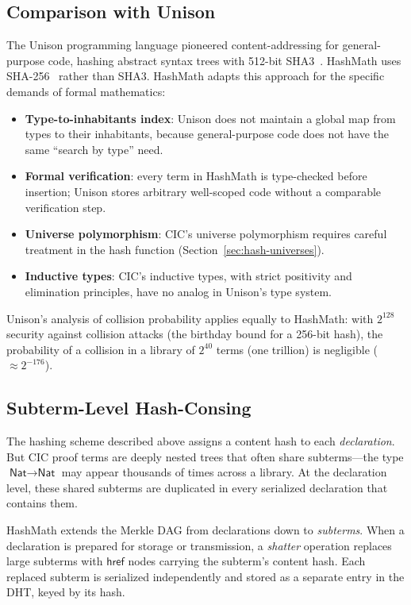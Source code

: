 \documentclass[11pt]{article}
\theoremstyle{definition}
\theoremstyle{plain}
\theoremstyle{remark}
\newcommand{\Nat}{\textsf{Nat}}
\newcommand{\hrefE}{\textsf{href}}
\begin{document}
\subsection{Comparison with Unison}
\label{sec:unison}

The Unison programming language pioneered content-addressing for general-purpose code,
hashing abstract syntax trees with 512-bit SHA3~\cite{unison}.
HashMath uses SHA-256~\cite{sha256} rather than SHA3.
HashMath adapts this approach for the specific demands of formal mathematics:

\begin{itemize}[nosep]
  \item \textbf{Type-to-inhabitants index}: Unison does not maintain a global map from types
    to their inhabitants, because general-purpose code does not have the same ``search by type'' need.
  \item \textbf{Formal verification}: every term in HashMath is type-checked before insertion;
    Unison stores arbitrary well-scoped code without a comparable verification step.
  \item \textbf{Universe polymorphism}: CIC's universe polymorphism requires careful treatment
    in the hash function (Section~\ref{sec:hash-universes}).
  \item \textbf{Inductive types}: CIC's inductive types, with strict positivity and elimination principles,
    have no analog in Unison's type system.
\end{itemize}

Unison's analysis of collision probability applies equally to HashMath: with $2^{128}$
security against collision attacks (the birthday bound for a 256-bit hash), the probability of a collision in a library of $2^{40}$
terms (one trillion) is negligible ($\approx 2^{-176}$).


\subsection{Subterm-Level Hash-Consing}
\label{sec:subterm-hashing}

The hashing scheme described above assigns a content hash to each \emph{declaration}.
But CIC proof terms are deeply nested trees that often share subterms---the type
$\Nat \to \Nat$ may appear thousands of times across a library.
At the declaration level, these shared subterms are duplicated in every serialized declaration
that contains them.

HashMath extends the Merkle DAG from declarations down to \emph{subterms}.
When a declaration is prepared for storage or transmission, a \emph{shatter} operation
replaces large subterms with $\hrefE$ nodes carrying the subterm's content hash.
Each replaced subterm is serialized independently and stored as a separate entry
in the DHT, keyed by its hash.
\end{document}
